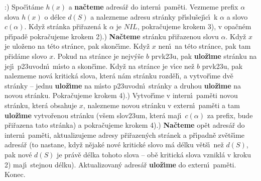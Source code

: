 :) Spo\v c\'\i t\'ame $h\left(x\right)$ a {\bf na\v cteme} adres\'a\v r do intern\'\i\ pam\v eti. 
Vez\-me\-me prefix $\alpha$ slova $h\left(x\right)$ o d\'elce $d\left(S\right)$ a nalezneme 
adresu str\'anky p\v r\'\i slu\v sej\'\i c\'\i\ k $\alpha$ a slovo $
c\left(\alpha \right)$. 
Kdy\v z str\'anka p\v ri\v razen\'a k $\alpha$ je $NIL$, pokra\v cu\-je\-me krokem 
3), v opa\v cn\'em p\v r\'\i pad\v e pokra\v cu\-je\-me krokem 2).) {\bf Na\v cteme} str\'anku p\v ri\v razenou slovu $\alpha$. Kdy\v z $
x$ je 
ulo\v zeno na t\'eto str\'ance, pak skon\v c\'\i me. Kdy\v z $x$ nen\'\i\ na 
t\'eto str\'ance, pak tam p\v rid\'ame slovo $x$. Pokud na str\'ance 
je nejv\'y\v se $b$ prvk\accent23u, pak {\bf ulo\v z\'\i me} str\'anku 
na jej\'\i\ p\accent23uvodn\'\i\ m\'\i sto a skon\v c\'\i me. Kdy\v z na 
str\'ance je v\'\i ce ne\v z $b$ prvk\accent23u, pak nalezneme nov\'a 
kritick\'a slova, 
kter\'a n\'am str\'anku rozd\v el\'\i , a vytvo\v r\'\i me dv\v e str\'anky -- 
jednu {\bf ulo\v z\'\i me} na m\'\i sto p\accent23uvodn\'\i\ str\'anky a 
druhou {\bf ulo\v z\'\i me} na novou str\'anku. Pokra\v cujeme krokem 
4).) Vytvo\v r\'\i me v intern\'\i\ pam\v eti novou str\'anku, kter\'a 
obsahuje $x$, nalezneme novou str\'anku v extern\'\i\ pam\v eti a 
tam {\bf ulo\v z\'\i me} vytvo\v renou str\'anku (v\v sem slov\accent23um, 
kter\'a maj\'\i\ $c\left(\alpha \right)$ za prefix, bude p\v ri\v razena tato str\'anka) a 
pokra\v cujeme krokem 4).) {\bf Na\v cteme} op\v et adres\'a\v r do intern\'\i\ pam\v eti, 
aktualizujeme adresy p\v ri\v razen\'ych str\'anek a p\v r\'\i padn\v e 
zv\v et\v s\'\i me adres\'a\v r (to nastane, kdy\v z n\v ejak\'e nov\'e kritick\'e 
slovo m\'a d\'elku v\v et\v s\'\i\ ne\v z $d\left(S\right)$, pak nov\'e $d\left(S
\right)$ je pr\'av\v e 
d\'elka tohoto slova -- ob\v e kritick\'a slova vznikl\'a v kroku 
2) maj\'\i\ stejnou d\'elku). Aktualizovan\'y adres\'a\v r {\bf ulo\v z\'\i me} do 
extern\'\i\ pam\v eti. Konec.
\medskip

